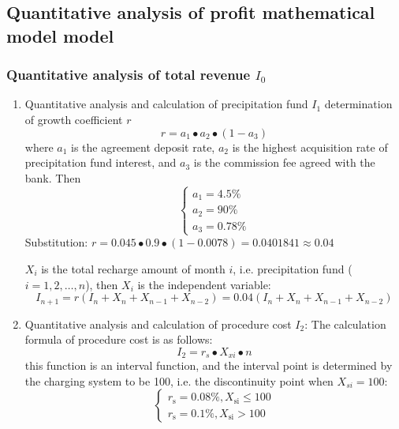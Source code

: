 \documentclass[../mcmpaper]{subfiles}
\begin{document}
\subsection{Quantitative analysis of profit mathematical model model}
\subsubsection{Quantitative analysis of total revenue $I_0$}
\begin{enumerate}[label=\arabic*)]
    \item Quantitative analysis and calculation of precipitation fund $I_1$ determination of growth coefficient $r$
\begin{equation}
r=a_1\bullet a_2\bullet (1-a_3)
\end{equation}
where $a_{1}$ is the agreement deposit rate, $a_2$ is the highest acquisition rate of precipitation fund interest, and $a_3$ is the commission fee agreed with the bank. Then
\begin{equation}
\begin{cases}
a_{1} = 4.5\% \\
a_2 = 90\% \\
a_3 = 0.78\%
\end{cases}
\end{equation}
Substitution: $r=0.045 \bullet 0.9 \bullet(1-0.0078)=0.0401841 \approx 0.04$
\par
$X_i$ is the total recharge amount of month $i$, i.e. precipitation fund ($i=1, 2,\dots, n$), then $X_i$ is the independent variable:
\begin{equation}
I_{n+1}=r\left(I_{n}+X_{n}+X_{n-1}+X_{n-2}\right)=0.04\left(I_{n}+X_{n}+X_{n-1}+X_{n-2}\right)
\end{equation}
    \item Quantitative analysis and calculation of procedure cost $I_2$: The calculation formula of procedure cost is as follows:
\begin{equation}
I_2=r_s\bullet X_{xi}\bullet n
\end{equation}
this function is an interval function, and the interval point is determined by the charging system to be 100, i.e. the discontinuity point when $X_{si}=100$:
\begin{equation}
\left\{\begin{array}{l}
r_{\mathrm{s}}=0.08 \%, X_{\mathrm{si}} \leq 100 \\
r_{\mathrm{s}}=0.1 \%, X_{\mathrm{si}}>100
\end{array}\right.
\end{equation}

\end{enumerate}
\end{document}
